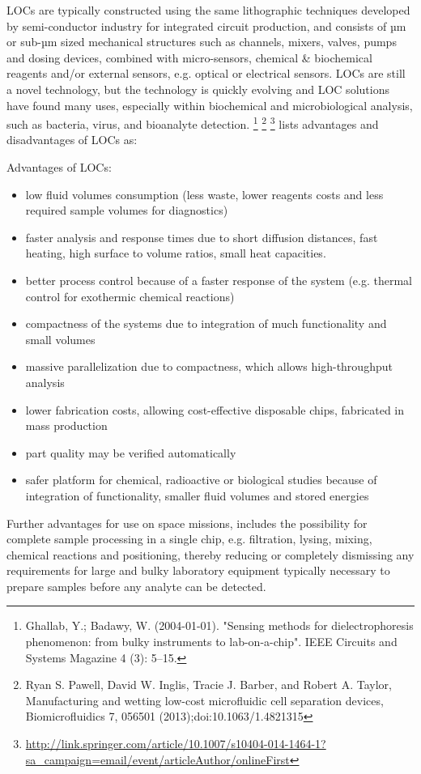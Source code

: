LOCs are typically constructed using the same lithographic techniques developed by semi-conductor industry for integrated circuit production, and consists of µm or sub-µm sized mechanical structures such as channels, mixers, valves, pumps and dosing devices, combined with micro-sensors, chemical \& biochemical reagents and/or external sensors, e.g. optical or electrical sensors. LOCs are still a novel technology, but the technology is quickly evolving and LOC solutions have found many uses, especially within biochemical and microbiological analysis, such as bacteria, virus, and bioanalyte detection.
\footnote{Ghallab, Y.; Badawy, W. (2004-01-01). "Sensing methods for dielectrophoresis phenomenon: from bulky instruments to lab-on-a-chip". IEEE Circuits and Systems Magazine 4 (3): 5–15.} \footnote{Ryan S. Pawell, David W. Inglis, Tracie J. Barber, and Robert A. Taylor, Manufacturing and wetting low-cost microfluidic cell separation devices, Biomicrofluidics 7, 056501 (2013);doi:10.1063/1.4821315} \footnote{\url{http://link.springer.com/article/10.1007/s10404-014-1464-1?sa_campaign=email/event/articleAuthor/onlineFirst}} lists advantages and disadvantages of LOCs as:

Advantages of LOCs:
\begin{itemize}
    \item low fluid volumes consumption (less waste, lower reagents costs and less required sample volumes for diagnostics)
    \item faster analysis and response times due to short diffusion distances, fast heating, high surface to volume ratios, small heat capacities.
    \item better process control because of a faster response of the system (e.g. thermal control for exothermic chemical reactions)
    \item compactness of the systems due to integration of much functionality and small volumes
    \item massive parallelization due to compactness, which allows high-throughput analysis
    \item lower fabrication costs, allowing cost-effective disposable chips, fabricated in mass production
    \item part quality may be verified automatically
    \item safer platform for chemical, radioactive or biological studies because of integration of functionality, smaller fluid volumes and stored energies
\end{itemize}
Further advantages for use on space missions, includes the possibility for complete sample processing in a single chip, e.g. filtration, lysing, mixing, chemical reactions and positioning, thereby reducing or completely dismissing any requirements for large and bulky laboratory equipment typically necessary to prepare samples before any analyte can be detected.

